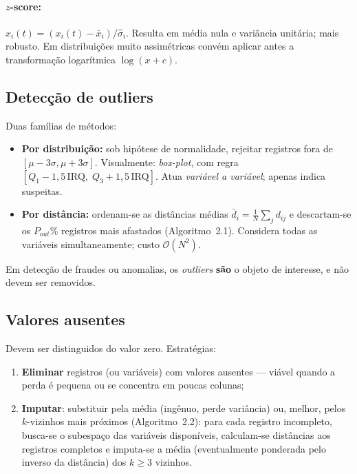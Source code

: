 \paragraph{$z$-score:} $\hat{x}_i(t)=(x_i(t)-\bar{x}_i)/\hat{\sigma}_i$.
Resulta em média nula e variância unitária; mais robusto. Em
distribuições muito assimétricas convém aplicar antes a transformação
logarítmica $\log(x+c)$.

\subsection{Detecção de outliers}

Duas famílias de métodos:
\begin{itemize}[leftmargin=1.2cm]
  \item \textbf{Por distribuição:} sob hipótese de normalidade,
        rejeitar registros fora de $[\mu-3\sigma,\mu+3\sigma]$.
        Visualmente: \emph{box-plot}, com regra
        $[Q_1-1{,}5\,\mathrm{IRQ},\;Q_3+1{,}5\,\mathrm{IRQ}]$. Atua
        \emph{variável a variável}; apenas indica suspeitas.
  \item \textbf{Por distância:} ordenam-se as distâncias médias
        $\bar{d}_i=\frac{1}{N}\sum_j d_{ij}$ e descartam-se os $P_{out}\%$
        registros mais afastados (Algoritmo~2.1). Considera todas as
        variáveis simultaneamente; custo $\mathcal{O}(N^2)$.
\end{itemize}

\begin{aplicacao}
Em detecção de fraudes ou anomalias, os \emph{outliers} \textbf{são} o
objeto de interesse, e não devem ser removidos.
\end{aplicacao}

\subsection{Valores ausentes}

Devem ser distinguidos do valor zero. Estratégias:
\begin{enumerate}[leftmargin=1.2cm]
  \item \textbf{Eliminar} registros (ou variáveis) com valores
        ausentes — viável quando a perda é pequena ou se concentra em
        poucas colunas;
  \item \textbf{Imputar}: substituir pela média (ingênuo, perde
        variância) ou, melhor, pelos $k$-vizinhos mais próximos
        (Algoritmo~2.2): para cada registro incompleto, busca-se o
        subespaço das variáveis disponíveis, calculam-se distâncias aos
        registros completos e imputa-se a média (eventualmente
        ponderada pelo inverso da distância) dos $k\geq 3$ vizinhos.
\end{enumerate}

